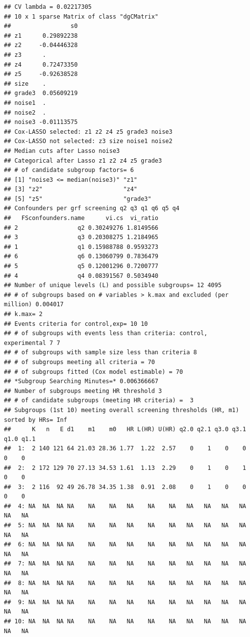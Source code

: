 \documentclass[smallextended]{svjour3}
\makeatletter
\newenvironment{kframe}{%
 \def\at@end@of@kframe{}%
 \ifinner\ifhmode%
  \def\at@end@of@kframe{\end{minipage}}%
  \begin{minipage}{\columnwidth}%
 \fi\fi%
 \def\FrameCommand##1{\hskip\@totalleftmargin \hskip-\fboxsep
 \colorbox{shadecolor}{##1}\hskip-\fboxsep
     \hskip-\linewidth \hskip-\@totalleftmargin \hskip\columnwidth}%
 \MakeFramed {\advance\hsize-\width
   \@totalleftmargin\z@ \linewidth\hsize
   \@setminipage}}%
 {\par\unskip\endMakeFramed%
 \at@end@of@kframe}
\newenvironment{knitrout}{}{} %
\makeatother
\begin{document}
\begin{knitrout}
\begin{kframe}
\begin{verbatim}
## CV lambda = 0.02217305 
## 10 x 1 sparse Matrix of class "dgCMatrix"
##                 s0
## z1      0.29892238
## z2     -0.04446328
## z3      .         
## z4      0.72473350
## z5     -0.92638528
## size    .         
## grade3  0.05609219
## noise1  .         
## noise2  .         
## noise3 -0.01113575
## Cox-LASSO selected: z1 z2 z4 z5 grade3 noise3 
## Cox-LASSO not selected: z3 size noise1 noise2 
## Median cuts after Lasso noise3 
## Categorical after Lasso z1 z2 z4 z5 grade3 
## # of candidate subgroup factors= 6 
## [1] "noise3 <= median(noise3)" "z1"                      
## [3] "z2"                       "z4"                      
## [5] "z5"                       "grade3"                  
## Confounders per grf screening q2 q3 q1 q6 q5 q4 
##   FSconfounders.name      vi.cs  vi_ratio
## 2                 q2 0.30249276 1.8149566
## 3                 q3 0.20308275 1.2184965
## 1                 q1 0.15988788 0.9593273
## 6                 q6 0.13060799 0.7836479
## 5                 q5 0.12001296 0.7200777
## 4                 q4 0.08391567 0.5034940
## Number of unique levels (L) and possible subgroups= 12 4095 
## # of subgroups based on # variables > k.max and excluded (per million) 0.004017 
## k.max= 2 
## Events criteria for control,exp= 10 10 
## # of subgroups with events less than criteria: control, experimental 7 7 
## # of subgroups with sample size less than criteria 8 
## # of subgroups meeting all criteria = 70 
## # of subgroups fitted (Cox model estimable) = 70 
## *Subgroup Searching Minutes=* 0.006366667 
## Number of subgroups meeting HR threshold 3 
## # of candidate subgroups (meeting HR criteria) =  3 
## Subgroups (1st 10) meeting overall screening thresholds (HR, m1) sorted by HRs= Inf 
##      K   n   E d1    m1    m0   HR L(HR) U(HR) q2.0 q2.1 q3.0 q3.1 q1.0 q1.1
##  1:  2 140 121 64 21.03 28.36 1.77  1.22  2.57    0    1    0    0    0    0
##  2:  2 172 129 70 27.13 34.53 1.61  1.13  2.29    0    1    0    1    0    0
##  3:  2 116  92 49 26.78 34.35 1.38  0.91  2.08    0    1    0    0    0    0
##  4: NA  NA  NA NA    NA    NA   NA    NA    NA   NA   NA   NA   NA   NA   NA
##  5: NA  NA  NA NA    NA    NA   NA    NA    NA   NA   NA   NA   NA   NA   NA
##  6: NA  NA  NA NA    NA    NA   NA    NA    NA   NA   NA   NA   NA   NA   NA
##  7: NA  NA  NA NA    NA    NA   NA    NA    NA   NA   NA   NA   NA   NA   NA
##  8: NA  NA  NA NA    NA    NA   NA    NA    NA   NA   NA   NA   NA   NA   NA
##  9: NA  NA  NA NA    NA    NA   NA    NA    NA   NA   NA   NA   NA   NA   NA
## 10: NA  NA  NA NA    NA    NA   NA    NA    NA   NA   NA   NA   NA   NA   NA

\end{verbatim}
\end{kframe}
\end{knitrout}
\end{document}
